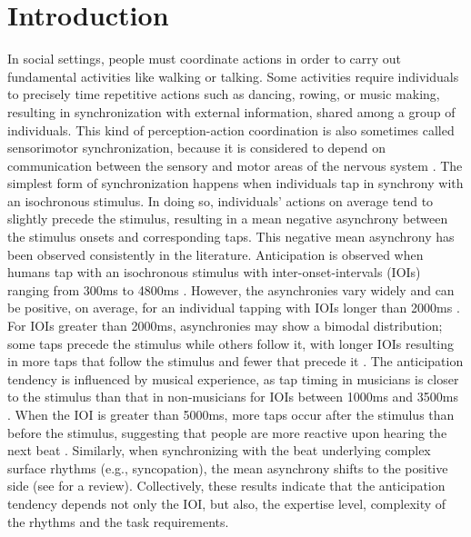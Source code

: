 \documentclass{report}
\begin{document}
\section{Introduction}
In social settings, people must coordinate actions in order to carry out fundamental activities like walking or talking. Some activities require individuals to precisely time repetitive actions such as dancing, rowing, or music making, resulting in synchronization with external information, shared among a group of individuals. This kind of perception-action coordination is also sometimes called sensorimotor synchronization, because it is considered to depend on communication between the sensory and motor areas of the nervous system \cite{oullier2005neural}. The simplest form of synchronization happens when individuals tap in synchrony with an isochronous stimulus. In doing so, individuals' actions on average tend to slightly precede the stimulus, resulting in a mean negative asynchrony between the stimulus onsets and corresponding taps. This negative mean asynchrony has been observed consistently in the literature. Anticipation is observed when humans tap with an isochronous stimulus with inter-onset-intervals (IOIs) ranging from 300ms to 4800ms \cite{mates1994temporal}. However, the asynchronies vary widely and can be positive, on average, for an individual tapping with IOIs longer than 2000ms \cite{mates1994temporal}. For IOIs greater than 2000ms, asynchronies may show a bimodal distribution; some taps precede the stimulus while others follow it, with longer IOIs resulting in more taps that follow the stimulus and fewer that precede it \cite{baaaath2016estimating}. The anticipation tendency is influenced by musical experience, as tap timing in musicians is closer to the stimulus than that in non-musicians for IOIs between 1000ms and 3500ms \cite{repp2007tapping}. When the IOI is greater than 5000ms, more taps occur after the stimulus than before the stimulus, suggesting that people are more reactive upon hearing the next beat \cite{miyake2004two}. Similarly, when synchronizing with the beat underlying complex surface rhythms (e.g., syncopation), the mean asynchrony shifts to the positive side \cite{wohlschlager1999synchronization, snyder2001tapping, large2015neural} (see \cite{repp2005sensorimotor} for a review). Collectively, these results indicate that the anticipation tendency depends not only the IOI, but also, the expertise level, complexity of the rhythms and the task requirements.
\end{document}

